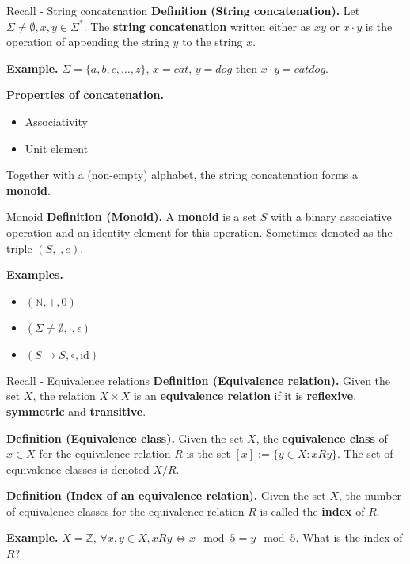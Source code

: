 \documentclass[10pt]{beamer}
\begin{document}
\begin{frame}[t]{Recall - String concatenation}
    \textbf{Definition (String concatenation).} Let $\Sigma \neq \emptyset, x, y \in \Sigma^*$. The \textbf{string concatenation} written either as $xy$ or $x \cdot y$ is the operation of appending the string $y$ to the string $x$.



    \textbf{Example.} $\Sigma = \{a, b, c, \dots, z\}$, $x = cat$, $y = dog$ then $x \cdot y = catdog$.



    \textbf{Properties of concatenation.}
    \begin{itemize}
        \setlength\itemsep{4em}
        \item Associativity
        \item Unit element
    \end{itemize}

    \vspace{4em}

    Together with a (non-empty) alphabet, the string concatenation forms a \textbf{monoid}.

\end{frame}

\begin{frame}{Monoid}
    \textbf{Definition (Monoid).} A \textbf{monoid} is a set $S$ with a binary associative operation and an identity element for this operation. Sometimes denoted as the triple $(S, \cdot, e)$.

    \textbf{Examples.}
    \begin{itemize}
        \setlength\itemsep{4em}
        \item $(\mathbb{N}, +, 0)$
        \item $(\Sigma \neq \emptyset, \cdot, \epsilon)$
        \item $(S \rightarrow S, \circ, \text{id})$
    \end{itemize}

\end{frame}

\begin{frame}[t]{Recall - Equivalence relations}
    \textbf{Definition (Equivalence relation).} Given the set $X$, the relation $X \times X$ is an \textbf{equivalence relation} if it is \textbf{reflexive}, \textbf{symmetric} and \textbf{transitive}.

    \textbf{Definition (Equivalence class).}  Given the set $X$, the \textbf{equivalence class} of $x \in X$ for the equivalence relation $R$ is the set $[x] := \{y \in X: xRy\}$. The set of equivalence classes is denoted $X/R$.

    \textbf{Definition (Index of an equivalence relation).} Given the set $X$, the number of equivalence classes for the equivalence relation $R$ is called the \textbf{index} of $R$.


    \textbf{Example.} $X = \mathbb{Z}$, $\forall x, y \in X, xRy \iff x \mod 5 = y \mod 5$. What is the index of $R$?
\end{frame}
\end{document}

